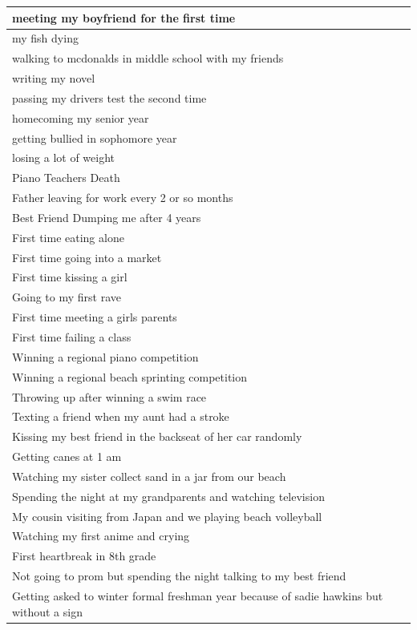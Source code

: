 \documentclass[
  .7em,
  letterpaper,
  DIV=11,
  numbers=noendperiod]{scrartcl}
\begin{document}
\begin{table}
\begin{tabular}{l}
\hline
meeting my boyfriend for the first time\\
\hline
my fish dying\\
\hline
walking to mcdonalds in middle school with my friends\\
\hline
writing my novel\\
\hline
passing my drivers test the second time\\
\hline
homecoming my senior year\\
\hline
getting bullied in sophomore year\\
\hline
losing a lot of weight\\
\hline
Piano Teachers Death\\
\hline
Father leaving for work every 2 or so months\\
\hline
Best Friend Dumping me after 4 years\\
\hline
First time eating alone\\
\hline
First time going into a market\\
\hline
First time kissing a girl\\
\hline
Going to my first rave\\
\hline
First time meeting a girls parents\\
\hline
First time failing a class\\
\hline
Winning a regional piano competition\\
\hline
Winning a regional beach sprinting competition\\
\hline
Throwing up after winning a swim race\\
\hline
Texting a friend when my aunt had a stroke\\
\hline
Kissing my best friend in the backseat of her car randomly\\
\hline
Getting canes at 1 am\\
\hline
Watching my sister collect sand in a jar from our beach\\
\hline
Spending the night at my grandparents and watching television\\
\hline
My cousin visiting from Japan and we playing beach volleyball\\
\hline
Watching my first anime and crying\\
\hline
First heartbreak in 8th grade\\
\hline
Not going to prom but spending the night talking to my best friend\\
\hline
Getting asked to winter formal freshman year because of sadie hawkins but without a sign\\

\end{tabular}
\end{table}
\end{document}
